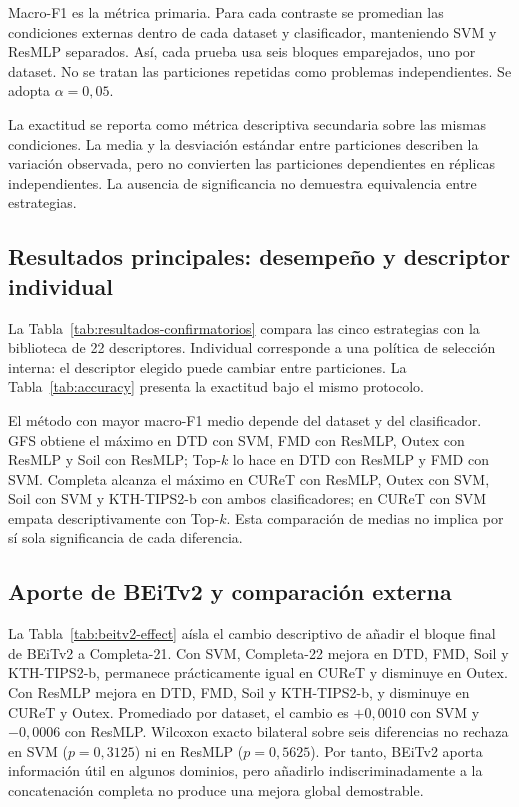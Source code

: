 \documentclass[a4paper,fleqn]{cas-sc}
\begin{document}
Macro-F1 es la métrica primaria. Para cada contraste se promedian las condiciones externas dentro de cada dataset y clasificador, manteniendo SVM y ResMLP separados. Así, cada prueba usa seis bloques emparejados, uno por dataset. No se tratan las particiones repetidas como problemas independientes. Se adopta $\alpha=0{,}05$.

La exactitud se reporta como métrica descriptiva secundaria sobre las mismas condiciones. La media y la desviación estándar entre particiones describen la variación observada, pero no convierten las particiones dependientes en réplicas independientes. La ausencia de significancia no demuestra equivalencia entre estrategias.

\subsection{Resultados principales: desempeño y descriptor individual}

La Tabla~\ref{tab:resultados-confirmatorios} compara las cinco estrategias con la biblioteca de 22 descriptores. Individual corresponde a una política de selección interna: el descriptor elegido puede cambiar entre particiones. La Tabla~\ref{tab:accuracy} presenta la exactitud bajo el mismo protocolo.






El método con mayor macro-F1 medio depende del dataset y del clasificador. GFS obtiene el máximo en DTD con SVM, FMD con ResMLP, Outex con ResMLP y Soil con ResMLP; Top-$k$ lo hace en DTD con ResMLP y FMD con SVM. Completa alcanza el máximo en CUReT con ResMLP, Outex con SVM, Soil con SVM y KTH-TIPS2-b con ambos clasificadores; en CUReT con SVM empata descriptivamente con Top-$k$. Esta comparación de medias no implica por sí sola significancia de cada diferencia.

\subsection{Aporte de BEiTv2 y comparación externa}

La Tabla~\ref{tab:beitv2-effect} aísla el cambio descriptivo de añadir el bloque final de BEiTv2 a Completa-21. Con SVM, Completa-22 mejora en DTD, FMD, Soil y KTH-TIPS2-b, permanece prácticamente igual en CUReT y disminuye en Outex. Con ResMLP mejora en DTD, FMD, Soil y KTH-TIPS2-b, y disminuye en CUReT y Outex. Promediado por dataset, el cambio es $+0{,}0010$ con SVM y $-0{,}0006$ con ResMLP. Wilcoxon exacto bilateral sobre seis diferencias no rechaza en SVM ($p=0{,}3125$) ni en ResMLP ($p=0{,}5625$). Por tanto, BEiTv2 aporta información útil en algunos dominios, pero añadirlo indiscriminadamente a la concatenación completa no produce una mejora global demostrable.
\end{document}
